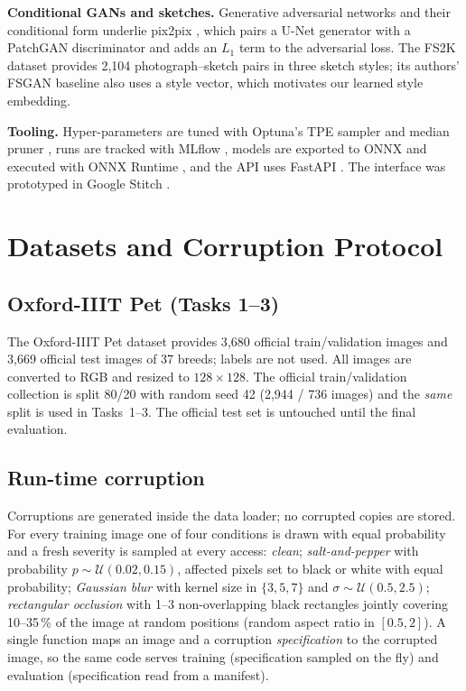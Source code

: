 \documentclass[conference]{IEEEtran}
\begin{document}
\textbf{Conditional GANs and sketches.} Generative adversarial networks \cite{goodfellow2014gan} and their conditional form \cite{mirza2014cgan} underlie pix2pix \cite{isola2017pix2pix}, which pairs a U-Net generator with a PatchGAN discriminator \cite{li2016patchgan} and adds an $L_1$ term to the adversarial loss. The FS2K dataset \cite{fan2022fs2k} provides 2{,}104 photograph--sketch pairs in three sketch styles; its authors' FSGAN baseline also uses a style vector, which motivates our learned style embedding.

\textbf{Tooling.} Hyper-parameters are tuned with Optuna's TPE sampler and median pruner \cite{akiba2019optuna}, runs are tracked with MLflow \cite{zaharia2018mlflow}, models are exported to ONNX and executed with ONNX Runtime \cite{onnx}, and the API uses FastAPI \cite{fastapi}. The interface was prototyped in Google Stitch \cite{stitch}.

\section{Datasets and Corruption Protocol}
\subsection{Oxford-IIIT Pet (Tasks 1--3)}
The Oxford-IIIT Pet dataset \cite{parkhi2012pets} provides 3{,}680 official train/validation images and 3{,}669 official test images of 37 breeds; labels are not used. All images are converted to RGB and resized to $128\times128$. The official train/validation collection is split 80/20 with random seed 42 (2{,}944 / 736 images) and the \emph{same} split is used in Tasks~1--3. The official test set is untouched until the final evaluation.

\subsection{Run-time corruption}
Corruptions are generated inside the data loader; no corrupted copies are stored. For every training image one of four conditions is drawn with equal probability and a fresh severity is sampled at every access: \emph{clean}; \emph{salt-and-pepper} with probability $p\sim\mathcal{U}(0.02,0.15)$, affected pixels set to black or white with equal probability; \emph{Gaussian blur} with kernel size in $\{3,5,7\}$ and $\sigma\sim\mathcal{U}(0.5,2.5)$; \emph{rectangular occlusion} with 1--3 non-overlapping black rectangles jointly covering 10--35\,\% of the image at random positions (random aspect ratio in $[0.5,2]$). A single function maps an image and a corruption \emph{specification} to the corrupted image, so the same code serves training (specification sampled on the fly) and evaluation (specification read from a manifest).
\end{document}
